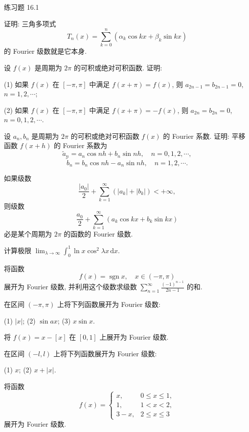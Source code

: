 \begin{exblock}{练习题 16.1}
\item 证明: 三角多项式
\[
  T_{n}(x)=\sum_{k=0}^{n}(\alpha_{k}\cos kx+\beta_{k}\sin kx)
\]
的 Fourier 级数就是它本身.
\item 设 $f(x)$ 是周期为 $2\pi$ 的可积或绝对可积函数. 证明:

(1) 如果 $f(x)$ 在 $[-\pi,\pi]$ 中满足 $f(x+\pi)=f(x)$, 则 $a_{2n-1}=b_{2n-1}=0$, $n=1,2,\cdots$;

(2) 如果 $f(x)$ 在 $[-\pi,\pi]$ 中满足 $f(x+\pi)=-f(x)$, 则 $a_{2n}=b_{2n}=0$, $n=0,1,2,\cdots$.
\item 设 $a_{n}, b_{n}$ 是周期为 $2\pi$ 的可积或绝对可积函数 $f(x)$ 的 Fourier 系数. 证明: 平移函数 $f(x+h)$ 的 Fourier 系数为
\[
  \tilde{a}_{n}=a_{n}\cos nh+b_{n}\sin nh,\quad n=0,1,2,\cdots,%
\]
\[
  \tilde{b}_{n}=b_{n}\cos nh-a_{n}\sin nh,\quad n=1,2,\cdots.
\]
\item 如果级数
\[
  \frac{|a_{0}|}{2}+\sum_{k=1}^{\infty}(|a_{k}|+|b_{k}|)<+\infty,
\]
则级数
\[
  \frac{a_{0}}{2}+\sum_{k=1}^{\infty}(a_{k}\cos kx+b_{k}\sin kx)
\]
必是某个周期为 $2\pi$ 的函数的 Fourier 级数.
\item 计算极限 $\displaystyle\lim_{\lambda\to\infty}\int_{0}^{1}\ln x\cos^{2}\lambda x\,\mathrm{d}x$.
\item 将函数
\[
  f(x)=\operatorname{sgn}x,\quad x\in(-\pi,\pi)
\]
展开为 Fourier 级数, 并利用这个级数求级数 $\displaystyle\sum_{n=1}^{\infty}\frac{(-1)^{n-1}}{2n-1}$ 的和.
\item 在区间 $(-\pi,\pi)$ 上将下列函数展开为 Fourier 级数:

(1) $|x|$; \qquad (2) $\sin ax$; \qquad (3) $x\sin x$.
\item 将 $f(x)=x-[x]$ 在 $[0,1]$ 上展开为 Fourier 级数.
\item 在区间 $(-l,l)$ 上将下列函数展开为 Fourier 级数:

(1) $x$; \qquad (2) $x+|x|$.
\item 将函数
\[
  f(x)=\begin{cases}
    x, & 0\leqslant x\leqslant 1,\\
    1, & 1<x<2,\\
    3-x, & 2\leqslant x\leqslant 3
\end{cases}
\]
展开为 Fourier 级数.
\end{exblock}

